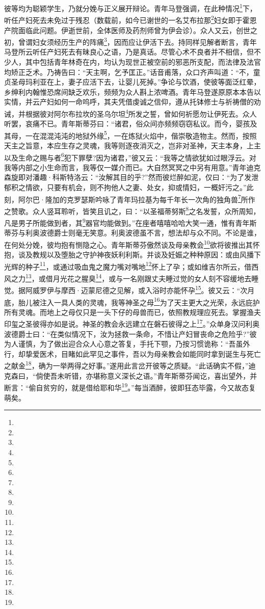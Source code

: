 \par 彼等均为聪颖学生，乃就分娩与正义展开辩论。青年马登强调，在此种情况\footnote{}下，听任产妇死去未免过于残忍（数载前，如今已谢世的一名艾布拉那\footnote{}妇女即于霍恩产院面临此问题。伊逝世前，全体医师及药剂师曾为伊会诊）。众人又云，创世之初，曾谓妇女须经历生产的阵痛\footnote{}，因而应让伊活下去。持同样见解者断言，青年马登所云听任产妇死去有昧良心之语，乃是真话。尽管心术不良者并不相信，但不少人，其中包括青年林奇在内，均认为现世正被空前的邪恶所支配，而法律及法官均矫正乏术。乃祷告曰：“天主啊，乞予匡正。”话音甫落，众口齐声叫道：“不，童贞圣母玛利亚在上，妻子应活下去，让婴儿死掉。”争论与饮酒，使彼等面泛红晕，乡绅利内翰惟恐席间缺乏欢乐，频频为众人斟上浓啤酒。青年马登遂原原本本告以实情，并云产妇如何一命呜呼，其夫凭借虔诚之信仰，遵从托钵修士与祈祷僧的劝诫，并根据彼对阿尔布拉坎的圣乌尔坦\footnote{}所发之誓，曾如何祈愿勿让伊死去。众人听罢，哀痛不已。青年斯蒂芬曰：“诸君，俗众间亦频频窃窃私议。而今，婴孩及其母，一在混混沌沌的地狱外缘\footnote{}，一在炼狱火焰中，偕崇敬造物主。然而，按照天主之旨意，本应生存之灵魂，我等则逐夜消灭之，岂非对圣神，天主本身，上主以及生命之赐与者\footnote{}犯下罪孽?因为诸君，”彼又云：“我等之情欲犹如过眼浮云。对我等内部之小生命而言，我等仅一媒介而已。大自然冥冥之中另有用意。”青年迪克森旋即对潘趣·科斯特洛云：“汝解其目的乎?”然而彼烂醉如泥，仅曰：“为了发泄郁积之情欲，只要有机会，则不拘他人之妻、处女，抑或情妇，一概奸污之。”此刻，阿尔巴·隆加的克罗瑟斯吟咏了青年玛拉基为每千年长一次角的独角兽\footnote{}所作之赞歌。众人竖耳聆听，皆笑且讥之，曰：“以圣福蒂努斯\footnote{}之名发誓，众所周知，凡是男子所能做到者，其\footnote{}器官均能做到。”在座者嘻嘻哈哈大笑一通，惟有青年斯蒂芬与利奥波德爵士则毫无笑意。利奥波德虽不言，想法却与众不同。不论是谁，在何处分娩，彼均抱有恻隐之心。青年斯蒂芬傲然谈及母亲教会\footnote{}欲将彼推出其怀抱，谈及教规以及堕胎之守护神夜妖利利斯。并谈及妊娠之种种原因：或由风播下光辉的种子\footnote{}，或通过吸血鬼之魔力嘴对嘴地\footnote{}怀上了孕；或如维吉尔所云，借西风之力\footnote{}，或借月光花之腥臭\footnote{}，或与一名刚跟丈夫睡过觉的女人刻不容缓地去睡觉。据阿威罗伊与摩西·迈蒙尼德之见解，或入浴时亦能怀孕\footnote{}。彼又云：“次月底，胎儿被注入一具人类的灵魂，我等神圣之母\footnote{}为了天主更大之光荣，永远庇护所有灵魂。而地上之母仅只是一头下仔的母兽而已，依照教规理应死去。掌握渔夫印玺之圣彼得亦如是说。神圣的教会永远建立在磐石彼得之上\footnote{}。”众单身汉问利奥波德爵士曰：“在类似情况下，汝为拯救一条命，不惜让产妇冒丧命之危险乎?”彼为人谨慎，为了做出迎合众人心意之答复，手托下颚，乃按习惯诡称：“吾虽外行，却挚爱医术，目睹如此罕见之事件，吾以为母亲教会如能同时拿到诞生与死亡之献金\footnote{}，确为一举两得之好事。”遂用此言岔开彼等之质疑。“此话确实不假，”迪克森曰，“倘使吾未听错，亦堪称意义深长之语。”青年斯蒂芬闻讫，喜出望外，并断言：“偷自贫穷的，就是借给耶和华\footnote{}。”每当酒醉，彼即狂态毕露，今又故态复萌矣。
